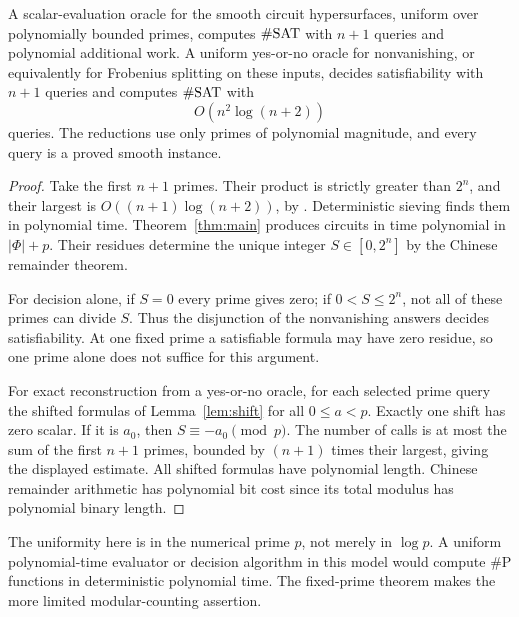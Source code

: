 \begin{proposition}\label{prop:uniform}
A scalar-evaluation oracle for the smooth circuit hypersurfaces, uniform over polynomially bounded primes, computes $\#\mathrm{SAT}$ with $n+1$ queries and polynomial additional work. A uniform yes-or-no oracle for nonvanishing, or equivalently for Frobenius splitting on these inputs, decides satisfiability with $n+1$ queries and computes $\#\mathrm{SAT}$ with
\[
O(n^2\log(n+2))
\]
queries. The reductions use only primes of polynomial magnitude, and every query is a proved smooth instance.
\end{proposition}
\begin{proof}
Take the first $n+1$ primes. Their product is strictly greater than $2^n$, and their largest is $O((n+1)\log(n+2))$, by \citet[Corollary to Theorem~3, (3.13), p.~69]{root-rosser-schoenfeld}. Deterministic sieving finds them in polynomial time. Theorem~\ref{thm:main} produces circuits in time polynomial in $|\Phi|+p$. Their residues determine the unique integer $S\in[0,2^n]$ by the Chinese remainder theorem.

For decision alone, if $S=0$ every prime gives zero; if $0<S\le2^n$, not all of these primes can divide $S$. Thus the disjunction of the nonvanishing answers decides satisfiability. At one fixed prime a satisfiable formula may have zero residue, so one prime alone does not suffice for this argument.

For exact reconstruction from a yes-or-no oracle, for each selected prime query the shifted formulas of Lemma~\ref{lem:shift} for all $0\le a<p$. Exactly one shift has zero scalar. If it is $a_0$, then $S\equiv-a_0\pmod p$. The number of calls is at most the sum of the first $n+1$ primes, bounded by $(n+1)$ times their largest, giving the displayed estimate. All shifted formulas have polynomial length. Chinese remainder arithmetic has polynomial bit cost since its total modulus has polynomial binary length.
\end{proof}

The uniformity here is in the numerical prime $p$, not merely in $\log p$. A uniform polynomial-time evaluator or decision algorithm in this model would compute $\#\mathrm P$ functions in deterministic polynomial time. The fixed-prime theorem makes the more limited modular-counting assertion.

